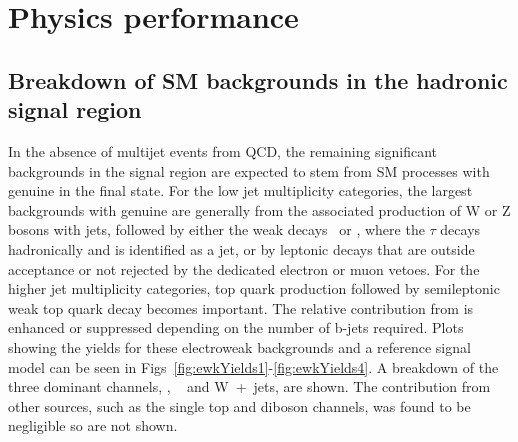 \section{Physics performance}
\label{sec:physics}

%

\subsection{Breakdown of SM backgrounds in the hadronic signal
  region\label{sec:bkgd-comp}}

In the absence of multijet events from QCD, the remaining significant
backgrounds in the signal region are expected to stem from SM
processes with genuine \met in the final state. For the low jet
multiplicity categories, the largest backgrounds with genuine \met are
generally from the associated production of W or Z bosons with jets,
followed by either the weak decays \znunu\ or \wtaunu, where the
$\tau$ decays hadronically and is identified as a jet, or by leptonic
decays that are outside acceptance or not rejected by the dedicated
electron or muon vetoes. For the higher jet multiplicity categories,
top quark production followed by semileptonic weak top quark decay
becomes important. The relative contribution from \ttbar is enhanced
or suppressed depending on the number of b-jets required. 
Plots showing the yields for these electroweak backgrounds and a reference
signal model can be seen in Figs~\ref{fig:ewkYields1}-\ref{fig:ewkYields4}. 
A breakdown of the three
dominant channels, \ttbar, \zInv~ and W~+~jets, are shown. The contribution from
other sources, such as the single top and diboson channels, was found to be
negligible so are not shown.

